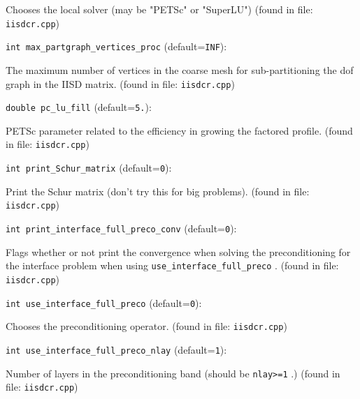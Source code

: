 Chooses the local solver (may be "PETSc" or "SuperLU")
 (found in file: \verb+iisdcr.cpp+)
\item\verb+int max_partgraph_vertices_proc+ {\rm(default=\verb|INF|)}:

The maximum number of vertices in the coarse mesh for
sub-partitioning the dof graph in the IISD matrix. 
 (found in file: \verb+iisdcr.cpp+)
\item\verb+double pc_lu_fill+ {\rm(default=\verb|5.|)}:

PETSc parameter related to the efficiency in growing
  the factored profile.
 (found in file: \verb+iisdcr.cpp+)
\item\verb+int print_Schur_matrix+ {\rm(default=\verb|0|)}:

Print the Schur matrix (don't try this for big problems).
 (found in file: \verb+iisdcr.cpp+)
\item\verb+int print_interface_full_preco_conv+ {\rm(default=\verb|0|)}:

Flags whether or not print the convergence when solving the
preconditioning for the interface problem when using
 \verb+use_interface_full_preco+ .
 (found in file: \verb+iisdcr.cpp+)
\item\verb+int use_interface_full_preco+ {\rm(default=\verb|0|)}:

Chooses the preconditioning operator. 
 (found in file: \verb+iisdcr.cpp+)
\item\verb+int use_interface_full_preco_nlay+ {\rm(default=\verb|1|)}:

Number of layers in the preconditioning band (should
 be  \verb+nlay>=1+ .) 
 (found in file: \verb+iisdcr.cpp+)

